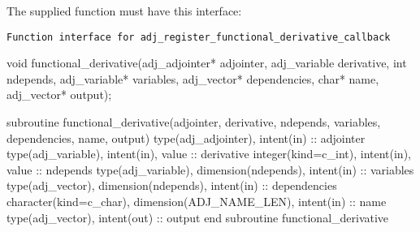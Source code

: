 The supplied function must have this interface:

\begin{boxwithtitle}{\texttt{Function interface for \texttt{adj_register_functional_derivative_callback}}}
\begin{minipage}{\columnwidth}
\begin{ccode}
void functional_derivative(adj_adjointer* adjointer,
                               adj_variable derivative, int ndepends, 
                               adj_variable* variables, adj_vector* dependencies,
                               char* name, adj_vector* output);
\end{ccode}
\begin{fortrancode}
subroutine functional_derivative(adjointer, derivative, ndepends, variables, 
                                 dependencies, name, output) 
  type(adj_adjointer), intent(in) :: adjointer
  type(adj_variable), intent(in), value :: derivative 
  integer(kind=c_int), intent(in), value :: ndepends
  type(adj_variable), dimension(ndepends), intent(in) :: variables
  type(adj_vector), dimension(ndepends), intent(in) :: dependencies
  character(kind=c_char), dimension(ADJ_NAME_LEN), intent(in) :: name
  type(adj_vector), intent(out) :: output
end subroutine functional_derivative
\end{fortrancode}
\end{minipage}
\end{boxwithtitle}


